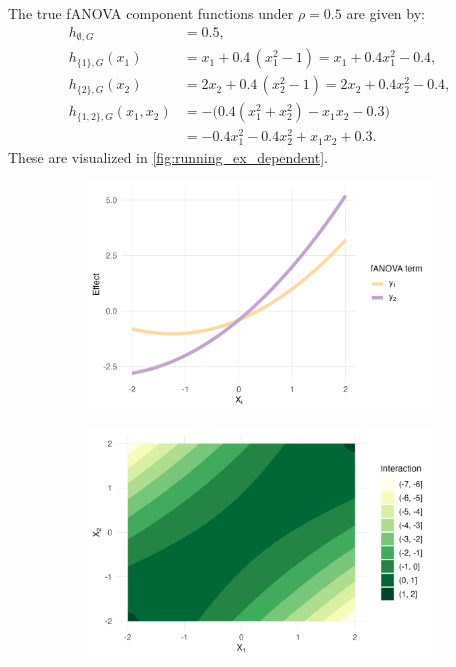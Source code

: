 The true fANOVA component functions under $\rho = 0.5$ are given by:
\begin{align*}
h_{\emptyset, G} &= 0.5, \\[0.5em]
h_{{\{1\}}, G}(x_1) &= x_1 + 0.4\,(x_1^2 - 1)
        = x_1 + 0.4x_1^2 - 0.4, \\[0.5em]
h_{{\{2\}}, G}(x_2) &= 2x_2 + 0.4\,(x_2^2 - 1)
        = 2x_2 + 0.4x_2^2 - 0.4, \\[0.5em]
h_{{\{1,2\}}, G}(x_1,x_2) 
&= -\Big( 0.4(x_1^2 + x_2^2) - x_1 x_2 - 0.3 \Big) \\[0.5em]
&= -0.4x_1^2 - 0.4x_2^2 + x_1 x_2 + 0.3.
\end{align*}
These are visualized in \autoref{fig:running_ex_dependent}.
\begin{figure}[htpb]
    \centering
    \begin{subfigure}[t]{0.49\textwidth}
        \centering
        \includegraphics[width=\textwidth]{images/experiment_section/running_example_a1p10_a2p20_a11p00_a22p00_a12p10_rhop05_main.png}
    \end{subfigure}%
    \hfill
    \begin{subfigure}[t]{0.49\textwidth}
        \centering
        \includegraphics[width=\textwidth]{images/experiment_section/running_example_a1p10_a2p20_a11p00_a22p00_a12p10_rhop05_interaction.png}

\end{subfigure}
\end{figure}
